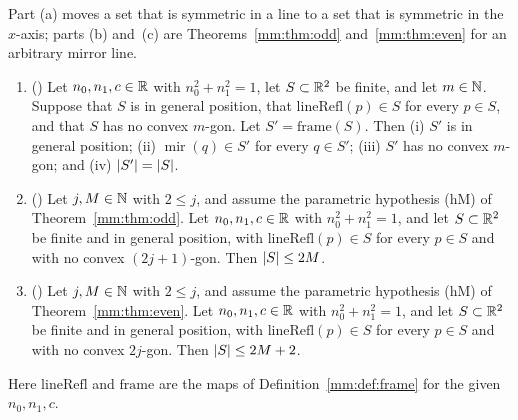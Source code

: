 \begin{theorem}\label{mm:thm:line}
Part (a) moves a set that is symmetric in a line to a set that is symmetric in the $x$-axis; parts (b)
and~(c) are Theorems~\ref{mm:thm:odd} and~\ref{mm:thm:even} for an arbitrary mirror line.
\begin{enumerate}[label=(\alph*)]
\item () Let $n_0,n_1,c\in\mathbb R$ with $n_0^2+n_1^2=1$, let $S\subset\mathbb R^2$ be finite, and let
  $m\in\mathbb N$. Suppose that $S$ is in general position, that $\mathrm{lineRefl}(p)\in S$ for every $p\in S$,
  and that $S$ has no convex $m$-gon. Let $S'=\mathrm{frame}(S)$. Then (i) $S'$ is in general position;
  (ii) $\operatorname{mir}(q)\in S'$ for every $q\in S'$; (iii) $S'$ has no convex $m$-gon; and
  (iv) $\lvert S'\rvert=\lvert S\rvert$.
\item () Let $j,M\in\mathbb N$ with $2\le j$, and assume the parametric
  hypothesis (hM) of Theorem~\ref{mm:thm:odd}. Let $n_0,n_1,c\in\mathbb R$ with $n_0^2+n_1^2=1$, and let
  $S\subset\mathbb R^2$ be finite and in general position, with $\mathrm{lineRefl}(p)\in S$ for every $p\in S$
  and with no convex $(2j+1)$-gon. Then $\lvert S\rvert\le2M$.
\item () Let $j,M\in\mathbb N$ with $2\le j$, and assume the parametric
  hypothesis (hM) of Theorem~\ref{mm:thm:even}. Let $n_0,n_1,c\in\mathbb R$ with $n_0^2+n_1^2=1$, and let
  $S\subset\mathbb R^2$ be finite and in general position, with $\mathrm{lineRefl}(p)\in S$ for every $p\in S$
  and with no convex $2j$-gon. Then $\lvert S\rvert\le2M+2$.
\end{enumerate}
Here $\mathrm{lineRefl}$ and $\mathrm{frame}$ are the maps of Definition~\ref{mm:def:frame} for the given
$n_0,n_1,c$.
\end{theorem}

